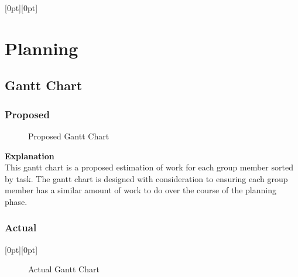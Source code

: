 \documentclass[a4paper]{article}
\newcommand{\Lpagenumber}{\ifdim\textwidth=\linewidth\else\bgroup
  \thispagestyle{empty}
  \dimendef\margin=0
  \ifodd\value{page}\margin=\oddsidemargin
  \else\margin=\evensidemargin
  \fi
  \raisebox{\dimexpr -\topmargin-\headheight-\headsep-0.5\linewidth}[0pt][0pt]{%
    \rlap{\hspace{\dimexpr \margin+\textheight+\footskip}%
    \llap{\rotatebox{0}{\thepage}}}}%
\egroup\fi}
\begin{document}
\begin{landscape} %
\Lpagenumber
\section{Planning}
\subsection{Gantt Chart}
\subsubsection{Proposed}
\begin{figure}[!ht] %
    \centering
    \caption{Proposed Gantt Chart}
    \label{fig:proposed_gantt}
\end{figure}

\textbf{Explanation} \\
This gantt chart is a proposed estimation of work for each group member sorted by task. The gantt chart is designed with consideration to ensuring each group member has a similar amount of work to do over the course of the planning phase.

\clearpage
\subsubsection{Actual} %
\Lpagenumber
\begin{figure}[!ht]
    \centering
    \caption{Actual Gantt Chart}
    \label{fig:actual_gantt}
\end{figure}


\end{landscape}
\end{document}
